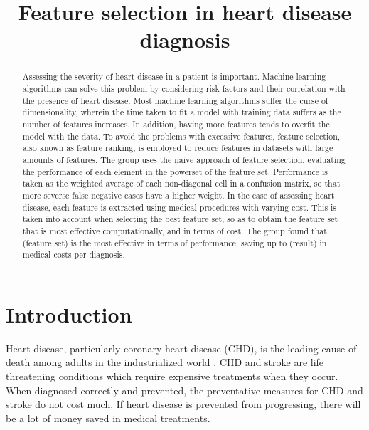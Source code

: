 \documentclass[conference]{IEEEtran}
\begin{document}
\title{Feature selection in heart disease diagnosis}

\author{
}

\maketitle

\begin{abstract}
	Assessing the severity of heart disease in a patient is important.
	Machine learning algorithms can solve this problem by considering risk factors and their correlation with the presence of heart disease.
	Most machine learning algorithms suffer the curse of dimensionality, wherein the time taken to fit a model with training data suffers as the number of features increases.
	In addition, having more features tends to overfit the model with the data.
	To avoid the problems with excessive features, feature selection, also known as feature ranking, is employed to reduce features in datasets with large amounts of features.
	The group uses the naive approach of feature selection, evaluating the performance of each element in the powerset of the feature set.
	Performance is taken as the weighted average of each non-diagonal cell in a confusion matrix, so that more severse false negative cases have a higher weight.
	In the case of assessing heart disease, each feature is extracted using medical procedures with varying cost.
	This is taken into account when selecting the best feature set, so as to obtain the feature set that is most effective computationally, and in terms of cost.
	The group found that (feature set) is the most effective in terms of performance, saving up to (result) in medical costs per diagnosis.
\end{abstract}

\section{Introduction}
	Heart disease, particularly coronary heart disease (CHD), is the leading cause of death among adults in the industrialized world \cite{bib:stroke_stat}.
	CHD and stroke are life threatening conditions which require expensive treatments when they occur.
	When diagnosed correctly and prevented, the preventative measures for CHD and stroke do not cost much.
	If heart disease is prevented from progressing, there will be a lot of money saved in medical treatments.
\end{document}

